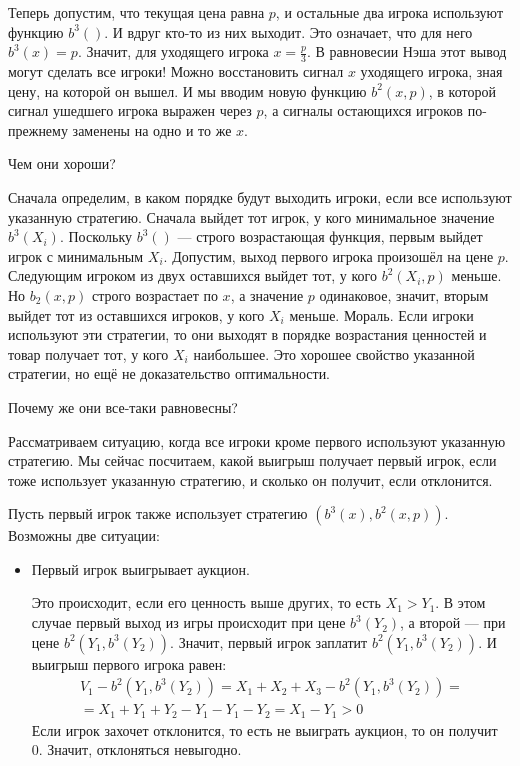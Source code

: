 \begin{myex}
Теперь допустим, что текущая цена равна $ p $, и остальные два игрока используют функцию $ b^{3}() $. И вдруг кто-то из них выходит. Это означает, что для него $ b^{3}(x)=p $. Значит, для уходящего игрока $ x=\frac{p}{3} $. В равновесии Нэша этот вывод могут сделать все игроки! Можно восстановить сигнал $ x $ уходящего игрока, зная цену, на которой он вышел. И мы вводим новую функцию $ b^{2}(x,p) $, в которой сигнал ушедшего игрока выражен через $ p $, а сигналы остающихся игроков по-прежнему заменены на одно и то же $ x $.

Чем они хороши?

Сначала определим, в каком порядке будут выходить игроки, если все используют указанную стратегию. Сначала выйдет тот игрок, у кого минимальное значение $ b^{3}(X_{i}) $. Поскольку $ b^{3}() $ — строго возрастающая функция, первым выйдет игрок с минимальным $ X_{i} $. Допустим, выход первого игрока произошёл на цене $ p $. Следующим игроком из двух оставшихся выйдет тот, у кого $ b^{2}(X_{i},p) $ меньше. Но $ b_{2}(x,p) $ строго возрастает по $ x $, а значение $ p $ одинаковое, значит, вторым выйдет тот из оставшихся игроков, у кого $ X_{i} $ меньше. Мораль. Если игроки используют эти стратегии, то они выходят в порядке возрастания ценностей и товар получает тот, у кого $ X_{i} $ наибольшее. Это хорошее свойство указанной стратегии, но ещё не доказательство оптимальности.

Почему же они все-таки равновесны?

Рассматриваем ситуацию, когда все игроки кроме первого используют указанную стратегию. Мы сейчас посчитаем, какой выигрыш получает первый игрок, если тоже использует указанную стратегию, и сколько он получит, если отклонится.

Пусть первый игрок также использует стратегию $ (b^{3}(x), b^{2}(x,p)) $. Возможны две ситуации:
\begin{itemize}
\item Первый игрок выигрывает аукцион.

Это происходит, если его ценность выше других, то есть $ X_{1}>Y_{1} $. В этом случае первый выход из игры происходит при цене $ b^{3}(Y_{2}) $, а второй — при цене $ b^{2}(Y_{1},b^{3}(Y_{2})) $. Значит, первый игрок заплатит $ b^{2}(Y_{1},b^{3}(Y_{2})) $. И выигрыш первого игрока равен:
\begin{multline}
V_{1}-b^{2}(Y_{1},b^{3}(Y_{2}))=X_{1}+X_{2}+X_{3}-b^{2}(Y_{1},b^{3}(Y_{2}))=\\
=X_{1}+Y_{1}+Y_{2}-Y_{1}-Y_{1}-Y_{2}=X_{1}-Y_{1}>0
\end{multline}
Если игрок захочет отклонится, то есть не выиграть аукцион, то он получит 0. Значит, отклоняться невыгодно.


\end{itemize}
\end{myex}
